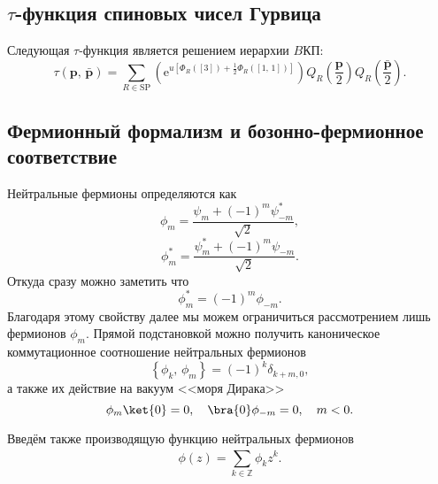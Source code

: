 \documentclass[a5paper,twoside]{article}
\begin{document}
\subsection{$\tau$-функция спиновых чисел Гурвица}
Следующая $\tau$-функция является решением иерархии $B$КП:
\begin{equation}
	\tau \left( \mathbf{p},\,\bar{\mathbf{p}} \right) =
	\sum_{R \in \mathrm{SP}}^{} \left( \mathrm{e} ^{u \left[ 
	\Phi_R\left( \left[ 3 \right]  \right) +\frac{1}{2}\Phi_R \left( \left[ 1,\,1 \right]  \right) \right] } \right) Q_R\left(\frac{\mathbf{p}}{2}\right)Q_R \left(\frac{\bar{\mathbf{p}}}{2}\right)
	\label{}
.\end{equation}
\subsection{Фермионный формализм и бозонно-фермионное соответствие}
Нейтральные фермионы определяются как
\begin{equation}
	\phi_m= \frac{\psi_m +\left( -1 \right) ^m \psi^*_{-m}}{\sqrt{2} }
,\end{equation} 
\begin{equation}
	\phi_m^*= \frac{\psi_m^* +\left( -1 \right) ^m \psi_{-m}}{\sqrt{2} }
.\end{equation}
Откуда сразу можно заметить что 
\begin{equation}
	\phi_m^*= (-1)^m \phi_{-m}
.\end{equation} 
Благодаря этому свойству далее мы можем ограничиться
рассмотрением лишь фермионов $ \phi_m  $.
Прямой подстановкой можно получить каноническое коммутационное соотношение нейтральных
фермионов
\begin{equation}
	\left\{ \phi_k,\,\phi_m \right\} =\left( -1 \right) ^k
	\delta_{k+m,0}
,\end{equation} 
а также их действие на вакуум <<моря Дирака>>
\begin{equation}
\phi_m \ket{0}=0,\quad
\bra{0}\phi_{-m} =0,\quad m<0.\end{equation} 

Введём также производящую функцию нейтральных фермионов
\begin{equation}
	\phi(z)= \sum_{k \in \mathbb{Z}}^{} \phi_k z^k
.\end{equation} 
\end{document}
